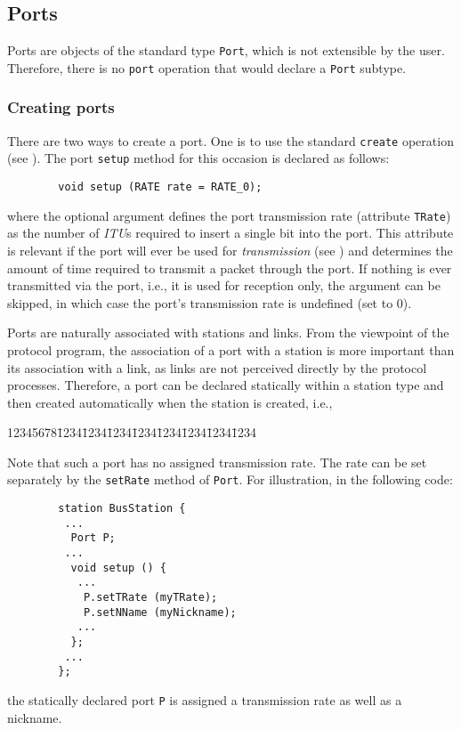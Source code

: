 \subsection{Ports}
\label{rm_to_po}

Ports are objects of the
standard type {\tt Port}, which is not extensible by the user.
Therefore, there is no {\tt port} operation that would declare a {\tt Port}
subtype.

\subsubsection{Creating ports}
\label{rm_to_po_cr}

There are two ways to create a port.
One is to use the standard {\tt create} operation
(see ).
The port {\tt setup} method for this occasion is declared as follows:
\begin{verbatim}
        void setup (RATE rate = RATE_0);
\end{verbatim}
where the optional argument defines the port transmission rate (attribute
{\tt TRate}) as the
number of {\em ITU\/}s required to insert a single bit into the port.
This attribute is relevant if the port will ever
be used for {\em transmission\/}
(see ) and determines the amount of time
required to transmit a packet through the port.
If nothing is ever transmitted via the port, i.e.,
it is used for reception only, the argument can be skipped, in which case
the port's transmission rate is undefined (set to 0).

Ports are naturally associated with stations and links.
From the viewpoint of the protocol program, the association of a port
with a station is more important than its association with a link, as
links are not perceived directly by the protocol processes.
Therefore, a port can be declared statically within a
station type and then created automatically when the station is created, i.e.,
{\tt\begin{tabbing}
12345678\=1234\=1234\=1234\=1234\=1234\=1234\=1234\=1234\kill
{}
\end{tabbing}}
\noindent
Note that such a port has no assigned transmission rate.
The rate can be set separately by the {\tt setRate} method of {\tt Port}.
For illustration, in the following code:
\begin{verbatim}
        station BusStation {
         ...
          Port P;
         ...
          void setup () {
           ...
            P.setTRate (myTRate);
            P.setNName (myNickname);
           ...
          };
         ...
        };
\end{verbatim}
\noindent
the statically declared port {\tt P} is assigned a transmission rate as well
as a nickname.


